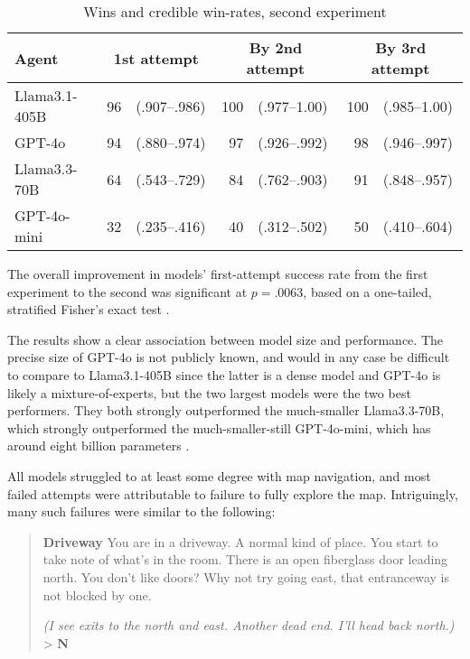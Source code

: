 \documentclass{article}
\newcommand{\roomtitle}[1]{\textbf{#1}\newline}
\newcommand{\playerinput}[2]{%
  \smallskip
  \textit{#1}%
  \\
  > \textbf{#2}\par%
}
\begin{document}
\begin{table}[h]
  \begin{center}
    \begin{tabular}{|l|rl|rl|rl|}
      \hline
      \textbf{Agent} & \multicolumn{2}{c|}{\textbf{1st attempt}} &
      \multicolumn{2}{c|}{\textbf{By 2nd attempt}} &
      \multicolumn{2}{c|}{\textbf{By 3rd attempt}} \\
      \hline
      Llama3.1-405B & 96 & (.907--.986) & 100 & (.977--1.00) & 100 &
      (.985--1.00) \\
      GPT-4o & 94 & (.880--.974) & 97 & (.926--.992) & 98 & (.946--.997) \\
      Llama3.3-70B & 64 & (.543--.729) & 84 & (.762--.903) & 91 &
      (.848--.957) \\
      GPT-4o-mini & 32 & (.235--.416) & 40 & (.312--.502) & 50 & (.410--.604) \\
      \hline
    \end{tabular}
  \end{center}
  \caption{Wins and credible win-rates, second experiment}
\end{table}

The overall improvement in models' first-attempt success rate from the first
experiment to the second was significant at $p=.0063$, based on a one-tailed,
stratified Fisher's exact test \autocite{Jung2014Fisher}.

The results show a clear association between model size and performance. The
precise size of GPT-4o is not publicly known, and would in any case be difficult
to compare to Llama3.1-405B since the latter is a dense model and GPT-4o is
likely a mixture-of-experts, but the two largest models were the two best
performers. They both strongly outperformed the much-smaller Llama3.3-70B, which
strongly outperformed the much-smaller-still GPT-4o-mini, which has around eight
billion parameters \autocite{Zeff2024Mini}.

All models struggled to at least some degree with map navigation, and most
failed attempts were attributable to failure to fully explore the map.
Intriguingly, many such failures were similar to the following:

\begin{quotation}
  \setlength{\parindent}{0pt}%
  \setlength{\parskip}{6pt plus 2pt}%
  \noindent\roomtitle{Driveway}
  You are in a driveway. A normal kind of place. You start to take note of
  what's in the room. There is an open fiberglass door leading north. You
  don't like doors? Why not try going east, that entranceway is not blocked by
  one.

  \playerinput{(I see exits to the north and east. Another dead end.
  I'll head back north.) }{N}
\end{quotation}
\end{document}
